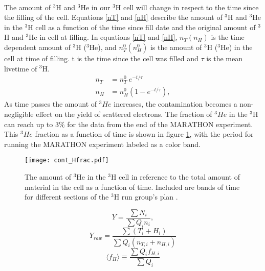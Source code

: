 \paragraph{}The amount of $^3$H and $^3$He in our $^3$H cell will change in respect to the time since the filling of the cell. Equations \ref{nT} and \ref{nH} describe the amount of $^3$H and $^3$He in the $^3$H cell as a function of the time since fill date and the original amount of $^3$H and $^3$He in cell at filling. In equations \ref{nT} and \ref{nH}, $n_T (n_H)$ is the time dependent amount of $^3$H ($^3$He), and  $n_T^0 (n_H^0)$ is the amount of $^3$H ($^3$He) in the cell at time of filling. t is the time since the cell was filled and $\tau$ is the mean livetime of $^3$H.
\begin{align}
	n_T &= n_T^0 \: e^{-t/\tau} \label{nT}\\
	n_H &= n_H^0(1 - e^{-t/\tau}) \label{nH},
\end{align}
As time passes the amount of $^3He$ increases, the contamination becomes a non-negligible effect on the yield of scattered electrons. The fraction of $^3He$ in the $^3$H can reach up to 3$\%$ for the data from the end of the MARATHON experiment. This $^3He$ fraction as a function of time is shown in figure \ref{Hfract}, with the period for running the MARATHON experiment labeled as a color band. 

\begin{figure}[t]
	\centering

	\texttt{[image: cont\_Hfrac.pdf]}
	
	\caption{The amount of $^3$He in the $^3$H cell in reference to the total amount of material in the cell as a function of time. Included are bands of time for different sections of the $^3$H run group's plan \cite{Beta}.}
	\label{Hfract}
\end{figure}
\begin{equation}
Y = \frac{\sum N_i}{\sum Q_i n_i}, \label{yield} 
\end{equation}
\begin{equation}
Y_{raw} = \frac{\sum (T_i + H_i)}{\sum Q_i (n_{T,i} + n_{H,i})} \label{Yraw}
\end{equation}
\begin{equation}
\langle f_H \rangle \equiv \frac{\sum Q_i f_{H,i}}{\sum Q_i} \label{QwHf}
\end{equation}


